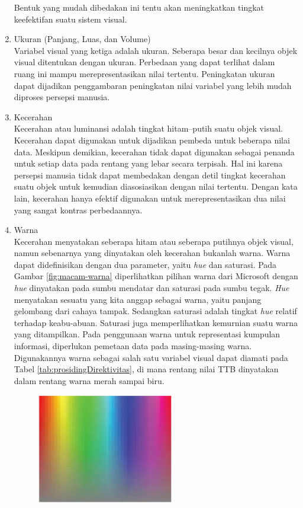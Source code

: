 \begin{enumerate}
\begin{figure}[t!]
        \label{fig:clef-macammacam}
    \end{figure} Bentuk yang mudah dibedakan ini tentu akan meningkatkan tingkat keefektifan suatu sistem visual.
    \item Ukuran (Panjang, Luas, dan Volume) \\
    Variabel visual yang ketiga adalah ukuran. Seberapa besar dan kecilnya objek visual ditentukan dengan ukuran. Perbedaan yang dapat terlihat dalam ruang ini mampu merepresentasikan nilai tertentu. Peningkatan ukuran dapat dijadikan penggambaran peningkatan nilai variabel yang lebih mudah diproses persepsi manusia. 
    \item Kecerahan \\
    Kecerahan atau luminansi adalah tingkat hitam–putih suatu objek visual. Kecerahan dapat digunakan untuk dijadikan pembeda untuk beberapa nilai data. Meskipun demikian, kecerahan tidak dapat digunakan sebagai penanda untuk setiap data pada rentang yang lebar secara terpisah. Hal ini karena persepsi manusia tidak dapat membedakan dengan detil tingkat kecerahan suatu objek untuk kemudian diasosiasikan dengan nilai tertentu. Dengan kata lain, kecerahan hanya efektif digunakan untuk merepresentasikan dua nilai yang sangat kontras perbedaannya.  
    \item Warna \\
    Kecerahan menyatakan seberapa hitam atau seberapa putihnya objek visual, namun sebenarnya yang dinyatakan oleh kecerahan bukanlah warna. Warna dapat didefinisikan dengan dua parameter, yaitu \textit{hue} dan saturasi. Pada Gambar \ref{fig:macam-warna} diperlihatkan pilihan warna dari Microsoft dengan \textit{hue} dinyatakan pada sumbu mendatar dan saturasi pada sumbu tegak. \textit{Hue} menyatakan sesuatu yang kita anggap sebagai warna, yaitu panjang gelombang dari cahaya tampak. Sedangkan saturasi adalah tingkat \textit{hue} relatif terhadap keabu-abuan. Saturasi juga memperlihatkan kemurnian suatu warna yang ditampilkan. Pada penggunaan warna untuk representasi kumpulan informasi, diperlukan pemetaan data pada masing-masing warna. Digunakannya warna sebagai salah satu variabel visual dapat diamati pada Tabel \ref{tab:prosidingDirektivitas}, di mana rentang nilai TTB dinyatakan dalam rentang warna merah sampai biru. \begin{figure}[t!]
        \centering
        \includegraphics[width=6cm]{Gambar/macam-warna.jpg}

\end{figure}
\end{enumerate}

